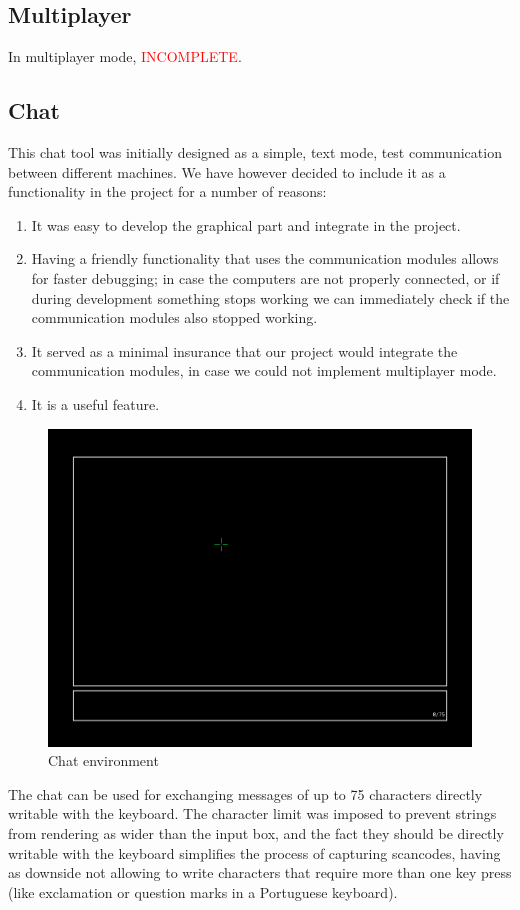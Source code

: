 \documentclass{article}
\theoremstyle{remark}
\begin{document}
\subsection{Multiplayer}
In multiplayer mode, \textcolor{red}{INCOMPLETE}.
\pagebreak
\subsection{Chat}
This chat tool was initially designed as a simple, text mode, test communication between different machines. We have however decided to include it as a functionality in the project for a number of reasons:
\begin{enumerate}
	\item It was easy to develop the graphical part and integrate in the project.
	\item Having a friendly functionality that uses the communication modules allows for faster debugging; in case the computers are not properly connected, or if during development something stops working we can immediately check if the communication modules also stopped working.
	\item It served as a minimal insurance that our project would integrate the communication modules, in case we could not implement multiplayer mode.
	\item It is a useful feature.
\end{enumerate}
\begin{figure}[H] \centering
	\includegraphics[scale=0.45]{chat01}
	\caption{Chat environment}
\end{figure}
The chat can be used for exchanging messages of up to 75 characters directly writable with the keyboard. The character limit was imposed to prevent strings from rendering as wider than the input box, and the fact they should be directly writable with the keyboard simplifies the process of capturing scancodes, having as downside not allowing to write characters that require more than one key press (like exclamation or question marks in a Portuguese keyboard). \par
\end{document}
